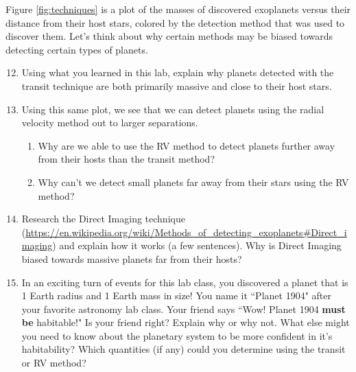 \documentclass[11pt]{article}
\begin{document}
Figure \ref{fig:techniques} is a plot of the masses of discovered exoplanets versus their distance from their host stars, colored by the detection method that was used to discover them. Let's think about why certain methods may be biased towards detecting certain types of planets.

\begin{enumerate}
\setcounter{enumi}{11}
    \item Using what you learned in this lab, explain why planets detected with the transit technique are both primarily massive and close to their host stars. 
        
    \item Using this same plot, we see that we can detect planets using the radial velocity method out to larger separations.
    
    \begin{enumerate}
        \item  Why are we able to use the RV method to detect planets further away from their hosts than the transit method? 
            
        \item Why can't we detect small planets far away from their stars using the RV method? 
            
    \end{enumerate}
    
    \item Research the Direct Imaging technique (\url{https://en.wikipedia.org/wiki/Methods_of_detecting_exoplanets#Direct_imaging}) and explain how it works (a few sentences).  Why is Direct Imaging biased towards massive planets far from their hosts?
    
    \item In an exciting turn of events for this lab class, you discovered a planet that is 1 Earth radius and 1 Earth mass in size! You name it ``Planet 1904" after your favorite astronomy lab class. Your friend says ``Wow! Planet 1904 \textbf{must be} habitable!" Is your friend right? Explain why or why not. What else might you need to know about the planetary system to be more confident in it's habitability?  Which quantities (if any) could you determine using the transit or RV method?
\end{enumerate}
\end{document}
